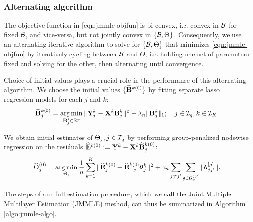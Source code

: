 \subsubsection{Alternating algorithm}
The objective function in \eqref{eqn:jmmle-objfun} is bi-convex, i.e. convex in ${\cal{B}}$ for fixed $\Theta$, and vice-versa, but not jointly convex in $\{ {\cal{B}}, \Theta \}$. Consequently, we use an alternating iterative algorithm to solve for $\{ {\cal{B}}, \Theta \}$ that minimizes \eqref{eqn:jmmle-objfun} by iteratively cycling between ${\cal{B}}$ and $\Theta$, i.e. holding one set of parameters fixed and solving for the other, then alternating until convergence.

Choice of initial values plays a crucial role in the performance of this alternating algorithm. %
%
%
We choose the initial values $\{ \widehat {{\mathbf{B}}}^{k (0)} \}$ by fitting separate lasso regression models for each $j$ and $k$:
%
\begin{align}\label{eqn:init-B}
\widehat {{\mathbf{B}}}_j^{k (0)} = \operatorname*{arg\,min}_{{\mathbf{B}}_j^k \in {\mathbb{R}}^p} \|{\mathbf{Y}}_j^k - {\mathbf{X}}^k {\mathbf{B}}_j^k \|^2 + \lambda_n \| {\mathbf{B}}_j^k \|_1; \quad
j \in {\cal{I}}_q, k \in {\cal{I}}_K.
\end{align}
%

We obtain initial estimates of $ \Theta_j, j \in {\cal{I}}_q$ by performing group-penalized nodewise regression on the residuals $\widehat {{\mathbf{E}}}^{k (0)} := {\mathbf{Y}}^k - {\mathbf{X}}^k \widehat {{\mathbf{B}}}_j^{k (0)}$:
%
\begin{align}\label{eqn:init-Theta}
\widehat \Theta_j^{(0)} = \operatorname*{arg\,min}_{\Theta_j} \frac{1}{n} \sum_{k=1}^K \|
\widehat {{\mathbf{E}}}_j^{k (0)} - \widehat {{\mathbf{E}}}_{-j}^{k (0)} {\boldsymbol{\theta}}_j^k \|^2
+ \gamma_n \sum_{j \neq j'} \sum_{g \in {\cal{G}}_y^{jj'}} \| {\boldsymbol{\theta}}_{jj'}^{[g]} \|.
\end{align}

The steps of our full estimation procedure, which we call the Joint Multiple Multilayer Estimation (JMMLE) method, can thus be summarized in Algorithm \ref{algo:jmmle-algo}.

